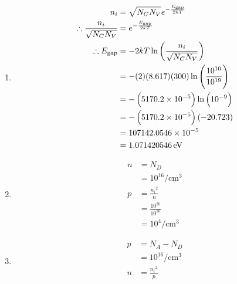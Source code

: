 \documentclass[fleqn, a4paper, 11pt, oneside]{amsart}
\theoremstyle{definition}
\theoremstyle{theorem}
\begin{document}
\begin{solution}
	\begin{enumerate}[leftmargin=*]
		\item
			\begin{align*}
				n_i                                   & = \sqrt{N_C N_V} e^{-\frac{E_{\text{gap}}}{2 k T}}                \\
				\therefore \frac{n_i}{\sqrt{N_C N_V}} & = e^{-\frac{E_{\text{gap}}}{2 k T}}                               \\
				\therefore E_{\text{gap}}             & = -2 k T \ln\left( \frac{n_i}{\sqrt{N_C N_V}} \right)             \\
                                                                      & = -(2) (8.617) (300) \ln\left( \frac{10^{10}}{10^{19}} \right)    \\
                                                                      & = -\left( 5170.2 \times 10^{-5} \right) \ln\left( 10^{-9} \right) \\
                                                                      & = -\left( 5170.2 \times 10^{-5} \right) (-20.723)                 \\
                                                                      & = 107142.0546 \times 10^{-5}                                      \\
                                                                      & = 1.071420546 \electronvolt
			\end{align*}
		\item
			\begin{align*}
				n & = N_D                                 \\
                                  & = 10^{16} \si{\per\centi\metre\cubed} \\
				p & = \frac{{n_i}^2}{n}                   \\
                                  & = \frac{10^{20}}{10^{16}}             \\
                                  & = 10^4 \si{\per\centi\metre\cubed}
			\end{align*}
		\item
			\begin{align*}
				p & = N_A - N_D                           \\
                                  & = 10^{16} \si{\per\centi\metre\cubed} \\
				n & = \frac{{n_i}^2}{p}                   \\

\end{align*}
\end{enumerate}
\end{solution}
\end{document}
